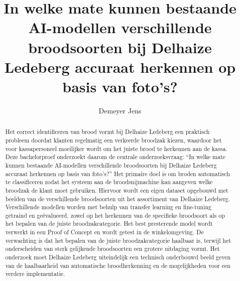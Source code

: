 \documentclass{hogent-article}
\title{In welke mate kunnen bestaande AI-modellen verschillende broodsoorten bij Delhaize Ledeberg accuraat herkennen op basis van foto's?}
\author{Demeyer Jens}
\begin{document}
\begin{abstract} 
    Het correct identificeren van brood vormt bij Delhaize Ledeberg een praktisch probleem doordat klanten regelmatig een verkeerde broodzak kiezen, waardoor het voor kassapersoneel moeilijker wordt om het juiste brood te herkennen aan de kassa. Deze bachelorproef onderzoekt daarom de centrale onderzoeksvraag: ``In welke mate kunnen bestaande AI-modellen verschillende broodsoorten bij Delhaize Ledeberg accuraat herkennen op basis van foto's?'' Het primaire doel is om broden automatisch te classificeren zodat het systeem aan de broodsnijmachine kan aangeven welke broodzak de klant moet gebruiken. Hiervoor wordt een eigen dataset opgebouwd met beelden van de verschillende broodsoorten uit het assortiment van Delhaize Ledeberg. Verschillende modellen worden met behulp van transfer learning en fine-tuning getraind en geëvalueerd, zowel op het herkennen van de specifieke broodsoort als op het bepalen van de juiste broodzakcategorie. Het best presterende model wordt verwerkt in een Proof of Concept en wordt getest in de winkelomgeving. De verwachting is dat het bepalen van de juiste broodzakcategorie haalbaar is, terwijl het onderscheiden van sterk gelijkende broodsoorten een grotere uitdaging vormt. Het onderzoek moet Delhaize Ledeberg uiteindelijk een technisch onderbouwd beeld geven van de haalbaarheid van automatische broodherkenning en de mogelijkheden voor een verdere implementatie. 
\end{abstract}

\tableofcontents



\printbibliography[heading=bibintoc]
\end{document}
